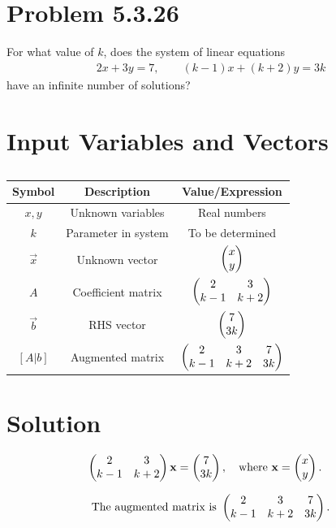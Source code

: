 \documentclass[12pt]{article}
\begin{document}
\section*{Problem 5.3.26}
For what value of $k$, does the system of linear equations
\begin{align}
2x + 3y = 7, \qquad (k-1)x + (k+2)y = 3k
\end{align}
have an infinite number of solutions?

\section*{Input Variables and Vectors}
\begin{center}
\begin{table}[H]
\centering
\begin{tabular}{|c|c|c|}
\hline
\textbf{Symbol} & \textbf{Description} & \textbf{Value/Expression} \\
\hline
$x,y$ & Unknown variables & Real numbers \\
$k$ & Parameter in system & To be determined \\
$\vec{x}$ & Unknown vector & $\begin{pmatrix}x \\ y\end{pmatrix}$ \\
$A$ & Coefficient matrix & $\begin{pmatrix}2 & 3 \\ k-1 & k+2\end{pmatrix}$ \\
$\vec{b}$ & RHS vector & $\begin{pmatrix}7 \\ 3k\end{pmatrix}$ \\
$[A|b]$ & Augmented matrix & $\begin{pmatrix}2 & 3 & 7 \\ k-1 & k+2 & 3k\end{pmatrix}$ \\
\hline
\end{tabular}
\caption{}
\label{}
\end{table}
\end{center}

\section*{Solution}
\begin{align}
\begin{pmatrix}2 & 3 \\ k-1 & k+2\end{pmatrix}\mathbf{x} &= \begin{pmatrix}7 \\ 3k\end{pmatrix}, \quad 
\text{where } \mathbf{x} = \begin{pmatrix}x \\ y\end{pmatrix}.
\end{align}

\begin{align}
\text{The augmented matrix is } 
\begin{pmatrix}2 & 3 & 7 \\ k-1 & k+2 & 3k\end{pmatrix}.
\end{align}
\end{document}

